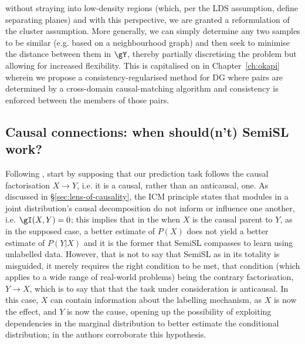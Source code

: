  \) without straying into low-density regions (which, per the LDS assumption, define separating
 planes) and with this perspective, we are granted a reformulation of the cluster assumption.
 More generally, we can simply determine any two samples to be similar (e.g. based on a
 neighbourhood graph) and then seek to minimise the distance between them in \( \gY \), thereby
 partially discretising the problem but allowing for increased flexibility.
 This is capitalised on in Chapter~\ref{ch:okapi} wherein we propose a consistency-regularised
 method for \ac{DG} where pairs are determined by a cross-domain causal-matching algorithm and
 consistency is enforced between the members of those pairs.
 \subsection{Causal connections: when should(n't) \acl{SemiSL} work?}\label{ssec:semisl-causality}
Following \cite{scholkopf2021toward}, start by supposing that our prediction task follows the
causal factorisation \( X \to Y\), i.e. it is a causal, rather than an anticausal, one.
%
As discussed in \S\ref{sec:lens-of-causality}, the ICM principle states that modules in a joint
distribution's causal decomposition do not inform or influence one another, i.e. \(\gI(X, Y) = 0
\); this implies that in the when \(X\) is the causal parent to \(Y\), as in the supposed case, a
better estimate of \(P(X)\) does not yield a better estimate of \(P(Y|X)\) and it is the former
that \ac{SemiSL} compasses to learn using unlabelled data.
%
However, that is not to say that \ac{SemiSL} as in its totality is misguided, it merely requires the
right condition to be met, that condition (which applies to a wide range of real-world problems)
being the contrary factorisation, \(Y \to X \), which is to say that that the task under
consideration is anticausal.
%
In this case, \(X\) can contain information about the labelling mechanism, as \(X\) is now the
effect, and \(Y\) is now the cause, opening up the possibility of exploiting dependencies in the
marginal distribution to better estimate the conditional distribution; in
\cite{scholkopf2012causal} the authors corroborate this hypothesis.
%
 
